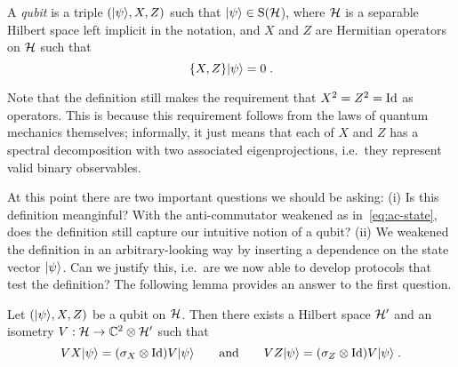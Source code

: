 \begin{definition}\label{def:qubit-2}
A \emph{qubit} is a triple $(|\psi\rangle,X,Z)$ such that $|\psi\rangle \in \mathrm{S}(\mathcal{H}$), where $\mathcal{H}$ is a separable Hilbert space left implicit in the notation, and $X$ and $Z$ are Hermitian operators on $\mathcal{H}$ such that
\begin{equation}\label{eq:ac-state}
\{X,Z\}|\psi\rangle = 0\;.
\end{equation}
\end{definition}

Note that the definition still makes the requirement that  $X^2=Z^2=\mathop{\rm Id}\nolimits$ as operators. This is because this requirement follows from the laws of quantum mechanics themselves; informally, it just means that each of $X$ and $Z$ has a spectral decomposition with two associated eigenprojections, i.e.\ they represent valid binary observables. 

At this point there are two important questions we should be asking: (i) Is this definition meanginful? With the anti-commutator weakened as in~\eqref{eq:ac-state}, does the definition still capture our intuitive notion of a qubit? (ii) We weakened the definition in an arbitrary-looking way by inserting a dependence on the state vector $|\psi\rangle$. Can we justify this, i.e.\ are we now able to develop protocols that test the definition? The following lemma provides an answer to the first question. 

\begin{lemma}\label{lem:qubit-2-rigid}
Let $(|\psi\rangle,X,Z)$  be a qubit on $\mathcal{H}$. Then there exists a Hilbert space $\mathcal{H}'$ and an isometry $V: \mathcal{H}\to  \mathbb{C}^2 \otimes \mathcal{H}'$  such that 
\begin{equation}\label{eq:qubit-2-rigid-a}
 V X |\psi\rangle =  (\sigma_X \otimes \mathop{\rm Id}\nolimits )V |\psi\rangle\qquad \text{and}\qquad  V Z |\psi\rangle =  (\sigma_Z \otimes \mathop{\rm Id}\nolimits )V |\psi\rangle \;.
\end{equation}
\end{lemma}

